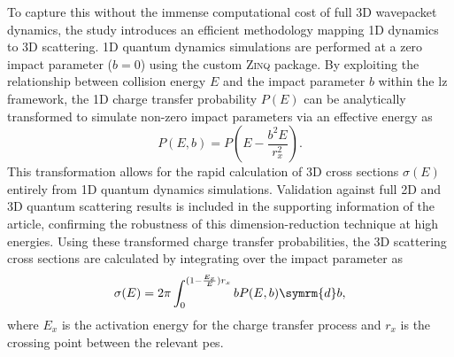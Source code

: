 To capture this without the immense computational cost of full 3D wavepacket dynamics, the study introduces an efficient methodology mapping 1D dynamics to 3D scattering. 1D quantum dynamics simulations are performed at a zero impact parameter ($b=0$) using the custom \textsc{Zinq} package. By exploiting the relationship between collision energy $E$ and the impact parameter $b$ within the \gls{lz} framework, the 1D charge transfer probability $P(E)$ can be analytically transformed to simulate non-zero impact parameters via an effective energy as
\begin{equation}
P(E,b)=P\left(E-\frac{b^2E}{r_x^2}\right).
\end{equation}
This transformation allows for the rapid calculation of 3D cross sections $\sigma(E)$ entirely from 1D quantum dynamics simulations. Validation against full 2D and 3D quantum scattering results is included in the supporting information of the article, confirming the robustness of this dimension-reduction technique at high energies. Using these transformed charge transfer probabilities, the 3D scattering cross sections are calculated by integrating over the impact parameter as
\begin{equation}
\sigma(E)=2\pi\int_0^{(1-\frac{E_x}{E})r_x}bP(E,b)\symrm{d}b,
\end{equation}
where $E_x$ is the activation energy for the charge transfer process and $r_x$ is the crossing point between the relevant \gls{pes}.

